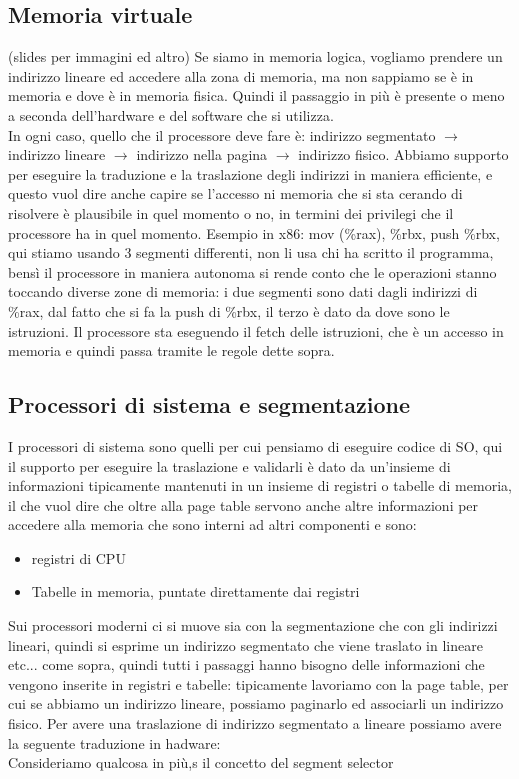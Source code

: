 \documentclass[12pt, oneside]{extbook}
\begin{document}
\subsection{Memoria virtuale}
(slides per immagini ed altro)
Se siamo in memoria logica, vogliamo prendere un indirizzo lineare ed accedere alla zona di memoria, ma non sappiamo se è in memoria e dove è in memoria fisica. Quindi il passaggio in più è presente o meno a seconda dell'hardware e del software che si utilizza.\\ In ogni caso, quello che il processore deve fare è: indirizzo segmentato $\rightarrow$ indirizzo lineare $\rightarrow$ indirizzo nella pagina $\rightarrow$ indirizzo fisico. Abbiamo supporto per eseguire la traduzione e la traslazione degli indirizzi in maniera efficiente, e questo vuol dire anche capire se l'accesso ni memoria che si sta cerando di risolvere è plausibile in quel momento o no, in termini dei privilegi che il processore ha in quel momento. Esempio in x86:
\textsf{mov (\%rax), \%rbx}, \textsf{push \%rbx}, qui stiamo usando 3 segmenti differenti, non li usa chi ha scritto il programma, bensì il processore in maniera autonoma si rende conto che le operazioni stanno toccando diverse zone di memoria: i due segmenti sono dati dagli indirizzi di \%rax, dal fatto che si fa la push di \%rbx, il terzo è dato da dove sono le istruzioni. Il processore sta eseguendo il fetch delle istruzioni, che è un accesso in memoria e quindi passa tramite le regole dette sopra.
\subsection{Processori di sistema e segmentazione}
I processori di sistema sono quelli per cui pensiamo di eseguire codice di SO, qui il supporto per eseguire la traslazione e validarli è dato da un'insieme di informazioni tipicamente mantenuti in un insieme di registri o tabelle di memoria, il che vuol dire che oltre alla page table servono anche altre informazioni per accedere alla memoria che sono interni ad altri componenti e sono:
\begin{itemize}
\item registri di CPU
\item Tabelle in memoria, puntate direttamente dai registri
\end{itemize}
Sui processori moderni ci si muove sia con la segmentazione che con gli indirizzi lineari, quindi si esprime un indirizzo segmentato che viene traslato in lineare etc... come sopra, quindi tutti i passaggi hanno bisogno delle informazioni che vengono inserite in registri e tabelle: tipicamente lavoriamo con la page table, per cui se abbiamo un indirizzo lineare, possiamo paginarlo ed associarli un indirizzo fisico. Per avere una traslazione di indirizzo segmentato a lineare possiamo avere la seguente traduzione in hadware:
\\ Consideriamo qualcosa in più,s il concetto del segment selector
\end{document}
